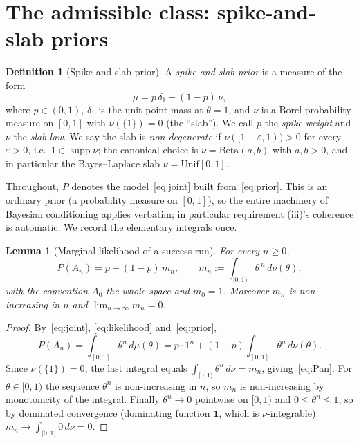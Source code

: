 \documentclass{amsart}
\newtheorem{lemma}{Lemma}
\theoremstyle{definition}
\newtheorem{definition}{Definition}
\newcommand{\one}{\mathbf{1}}
\begin{document}
\section{The admissible class: spike-and-slab priors}\label{sec:class}

\begin{definition}[Spike-and-slab prior]\label{def:spikeslab}
A \emph{spike-and-slab prior} is a measure of the form
\begin{equation}\label{eq:prior}
  \mu = p\,\delta_{1} + (1-p)\,\nu,
\end{equation}
where $p\in(0,1)$, $\delta_1$ is the unit point mass at $\theta=1$, and $\nu$ is
a Borel probability measure on $[0,1]$ with $\nu(\{1\})=0$ (the ``slab'').
We call $p$ the \emph{spike weight} and $\nu$ the \emph{slab law}. We say the
slab is \emph{non-degenerate} if $\nu([1-\varepsilon,1))>0$ for every
$\varepsilon>0$, i.e.\ $1\in\operatorname{supp}\nu$; the canonical choice is
$\nu=\mathrm{Beta}(a,b)$ with $a,b>0$, and in particular the
Bayes--Laplace slab $\nu=\mathrm{Unif}[0,1]$.
\end{definition}

Throughout, $P$ denotes the model~\eqref{eq:joint} built from~\eqref{eq:prior}.
This is an ordinary prior (a probability measure on $[0,1]$), so the entire
machinery of Bayesian conditioning applies verbatim; in particular requirement
(iii)'s coherence is automatic. We record the elementary integrals once.

\begin{lemma}[Marginal likelihood of a success run]\label{lem:marginal}
For every $n\ge0$,
\begin{equation}\label{eq:Pan}
  P(A_n)=p+(1-p)\,m_n,\qquad m_n:=\int_{[0,1)}\theta^{\,n}\,d\nu(\theta),
\end{equation}
with the convention $A_0$ the whole space and $m_0=1$. Moreover $m_n$ is
non-increasing in $n$ and $\lim_{n\to\infty}m_n=0$.
\end{lemma}

\begin{proof}
By~\eqref{eq:joint}, \eqref{eq:likelihood} and~\eqref{eq:prior},
\[
  P(A_n)=\int_{[0,1]}\theta^n\,d\mu(\theta)
  =p\cdot 1^n+(1-p)\int_{[0,1]}\theta^n\,d\nu(\theta).
\]
Since $\nu(\{1\})=0$, the last integral equals $\int_{[0,1)}\theta^n\,d\nu=m_n$,
giving~\eqref{eq:Pan}. For $\theta\in[0,1)$ the sequence $\theta^n$ is
non-increasing in $n$, so $m_n$ is non-increasing by monotonicity of the
integral. Finally $\theta^n\to 0$ pointwise on $[0,1)$ and $0\le\theta^n\le1$,
so by dominated convergence (dominating function $\one$, which is
$\nu$-integrable) $m_n\to\int_{[0,1)}0\,d\nu=0$.
\end{proof}
\end{document}
